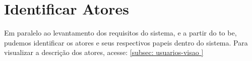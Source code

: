 \chapter{Identificar Atores}

Em paralelo ao levantamento dos requisitos do sistema, e a partir do to be, pudemos identificar os atores e seus respectivos papeis dentro do sistema. Para visualizar a descrição dos atores, acesse: \ref{subsec: usuarios-visao	}